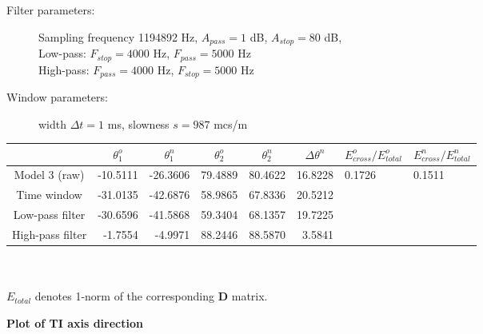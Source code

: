 \documentclass[a4paper,11pt]{article}
\begin{document}
\begin{description}
\item[Filter parameters:] Sampling frequency 1194892 Hz, $A_{pass} = 1$ dB, $A_{stop} = 80$ dB, \\ Low-pass: $F_{stop} = 4000$ Hz, $F_{pass} = 5000$ Hz \\ High-pass: $F_{pass} = 4000$ Hz, $F_{stop} = 5000$ Hz
\item[Window parameters:] width $\Delta t=1$ ms, slowness $s = 987$ mcs/m
\end{description}

\renewcommand{\arraystretch}{1.5}
\footnotesize
\begin{tabular}{c|rr|rr|r|ll}
				&\multicolumn{1}{c}{$\theta_1^o$} & \multicolumn{1}{c|}{$\theta_1^n$} & \multicolumn{1}{c}{$\theta_2^o$} & \multicolumn{1}{c|}{$\theta_2^n$} & \multicolumn{1}{c|}{$\Delta\theta^n$}& \multicolumn{1}{c}{$E_{cross}^o/E_{total}^o$} & \multicolumn{1}{c}{$E_{cross}^n/E_{total}^n$} \\ \hline
\hline  Model 3 (raw) & -10.5111 & -26.3606 & 79.4889 & 80.4622 & 16.8228 & 0.1726 & 0.1511 \\
		Time window & -31.0135 & -42.6876 & 58.9865 & 67.8336 & 20.5212& \color{red}{0.0445} & \color{red}{0.0099} \\
	   Low-pass filter & -30.6596 & -41.5868 & 59.3404 & 68.1357 & 19.7225 & \color{red}{0.0358} & \color{red}{0.0027} \\
 	   High-pass filter & -1.7554 & -4.9971 & 88.2446 & 88.5870 & 3.5841& \color{red}{0.0602} & \color{red}{0.0597} \\ 	   
 	    \hline 
\end{tabular} 
\normalsize
\\ \\
\quad *$E_{total}$ denotes 1-norm of the corresponding $\mathbf{D}$ matrix.
\renewcommand{\arraystretch}{1.0}

\vspace{\baselineskip}

\textbf{Plot of TI axis direction}\\
\end{document}
